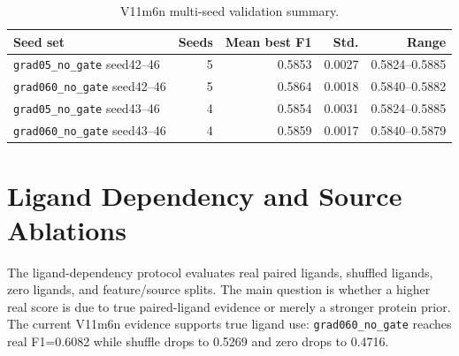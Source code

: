 \documentclass[11pt]{article}
\begin{document}
\begin{table}[t]
\centering
\caption{V11m6n multi-seed validation summary.}
\begin{tabular}{lrrrr}
\toprule
Seed set & Seeds & Mean best F1 & Std. & Range \\
\midrule
\texttt{grad05\_no\_gate} seed42--46 & 5 & 0.5853 & 0.0027 & 0.5824--0.5885 \\
\texttt{grad060\_no\_gate} seed42--46 & 5 & 0.5864 & 0.0018 & 0.5840--0.5882 \\
\texttt{grad05\_no\_gate} seed43--46 & 4 & 0.5854 & 0.0031 & 0.5824--0.5885 \\
\texttt{grad060\_no\_gate} seed43--46 & 4 & 0.5859 & 0.0017 & 0.5840--0.5879 \\
\bottomrule
\end{tabular}
\end{table}

\section*{Ligand Dependency and Source Ablations}
The ligand-dependency protocol evaluates real paired ligands, shuffled ligands, zero ligands, and feature/source splits.
The main question is whether a higher real score is due to true paired-ligand evidence or merely a stronger protein prior.
The current V11m6n evidence supports true ligand use: \texttt{grad060\_no\_gate} reaches real F1=0.6082 while shuffle drops to 0.5269 and zero drops to 0.4716.

\begin{table}[t]
\centering
\caption{Core test ligand-dependency results. Primary metric is global class-0 F1.}
\end{table}
\end{document}
